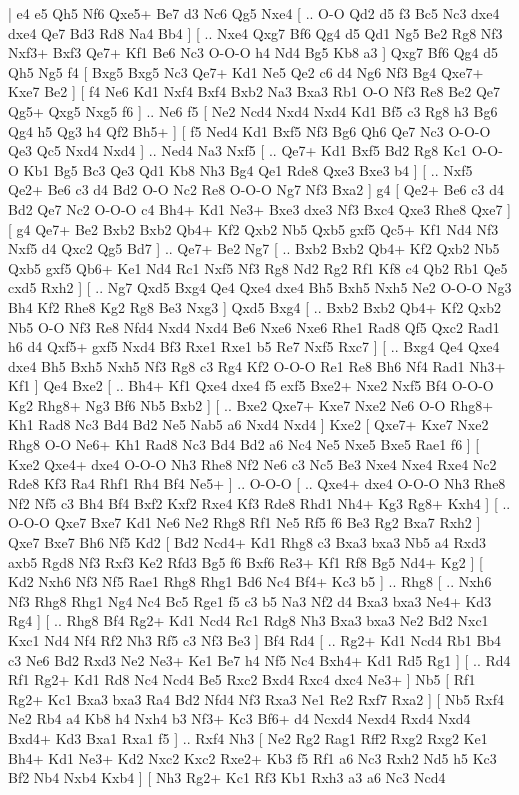 \makegametitle 
|   e4   e5    Qh5   Nf6    Qxe5+   Be7    d3   Nc6    Qg5   Nxe4 [ .. O-O  Qd2 d5  f3 Bc5  Nc3 dxe4  dxe4 Qe7  Bd3 Rd8  Na4 Bb4   ]  [ .. Nxe4  Qxg7 Bf6  Qg4 d5  Qd1 Ng5  Be2 Rg8  Nf3 Nxf3+  Bxf3 Qe7+  Kf1 Be6  Nc3 O-O-O  h4 Nd4  Bg5 Kb8  a3   ]  Qxg7   Bf6    Qg4   d5    Qh5   Ng5    f4 [  Bxg5 Bxg5  Nc3 Qe7+  Kd1 Ne5  Qe2 c6  d4 Ng6  Nf3 Bg4  Qxe7+ Kxe7  Be2   ]  [  f4 Ne6  Kd1 Nxf4  Bxf4 Bxb2  Na3 Bxa3  Rb1 O-O  Nf3 Re8  Be2 Qe7  Qg5+ Qxg5  Nxg5 f6   ] .. Ne6    f5 [  Ne2 Ncd4  Nxd4 Nxd4  Kd1 Bf5  c3 Rg8  h3 Bg6  Qg4 h5  Qg3 h4  Qf2 Bh5+   ]  [  f5 Ned4  Kd1 Bxf5  Nf3 Bg6  Qh6 Qe7  Nc3 O-O-O  Qe3 Qc5  Nxd4 Nxd4   ] .. Ned4    Na3   Nxf5 [ .. Qe7+  Kd1 Bxf5  Bd2 Rg8  Kc1 O-O-O  Kb1 Bg5  Bc3 Qe3  Qd1 Kb8  Nh3 Bg4  Qe1 Rde8  Qxe3 Bxe3  b4   ]  [ .. Nxf5  Qe2+ Be6  c3 d4  Bd2 O-O  Nc2 Re8  O-O-O Ng7  Nf3 Bxa2   ]  g4 [  Qe2+ Be6  c3 d4  Bd2 Qe7  Nc2 O-O-O  c4 Bh4+  Kd1 Ne3+  Bxe3 dxe3  Nf3 Bxc4  Qxe3 Rhe8  Qxe7   ]  [  g4 Qe7+  Be2 Bxb2  Bxb2 Qb4+  Kf2 Qxb2  Nb5 Qxb5  gxf5 Qc5+  Kf1 Nd4  Nf3 Nxf5  d4 Qxc2  Qg5 Bd7   ] .. Qe7+    Be2   Ng7 [ .. Bxb2  Bxb2 Qb4+  Kf2 Qxb2  Nb5 Qxb5  gxf5 Qb6+  Ke1 Nd4  Rc1 Nxf5  Nf3 Rg8  Nd2 Rg2  Rf1 Kf8  c4 Qb2  Rb1 Qe5  cxd5 Rxh2   ]  [ .. Ng7  Qxd5 Bxg4  Qe4 Qxe4  dxe4 Bh5  Bxh5 Nxh5  Ne2 O-O-O  Ng3 Bh4  Kf2 Rhe8  Kg2 Rg8  Be3 Nxg3   ]  Qxd5   Bxg4 [ .. Bxb2  Bxb2 Qb4+  Kf2 Qxb2  Nb5 O-O  Nf3 Re8  Nfd4 Nxd4  Nxd4 Be6  Nxe6 Nxe6  Rhe1 Rad8  Qf5 Qxc2  Rad1 h6  d4 Qxf5+  gxf5 Nxd4  Bf3 Rxe1  Rxe1 b5  Re7 Nxf5  Rxc7   ]  [ .. Bxg4  Qe4 Qxe4  dxe4 Bh5  Bxh5 Nxh5  Nf3 Rg8  c3 Rg4  Kf2 O-O-O  Re1 Re8  Bh6 Nf4  Rad1 Nh3+  Kf1   ]  Qe4   Bxe2 [ .. Bh4+  Kf1 Qxe4  dxe4 f5  exf5 Bxe2+  Nxe2 Nxf5  Bf4 O-O-O  Kg2 Rhg8+  Ng3 Bf6  Nb5 Bxb2   ]  [ .. Bxe2  Qxe7+ Kxe7  Nxe2 Ne6  O-O Rhg8+  Kh1 Rad8  Nc3 Bd4  Bd2 Ne5  Nab5 a6  Nxd4 Nxd4   ]  Kxe2 [  Qxe7+ Kxe7  Nxe2 Rhg8  O-O Ne6+  Kh1 Rad8  Nc3 Bd4  Bd2 a6  Nc4 Ne5  Nxe5 Bxe5  Rae1 f6   ]  [  Kxe2 Qxe4+  dxe4 O-O-O  Nh3 Rhe8  Nf2 Ne6  c3 Nc5  Be3 Nxe4  Nxe4 Rxe4  Nc2 Rde8  Kf3 Ra4  Rhf1 Rh4  Bf4 Ne5+   ] .. O-O-O [ .. Qxe4+  dxe4 O-O-O  Nh3 Rhe8  Nf2 Nf5  c3 Bh4  Bf4 Bxf2  Kxf2 Rxe4  Kf3 Rde8  Rhd1 Nh4+  Kg3 Rg8+  Kxh4   ]  [ .. O-O-O  Qxe7 Bxe7  Kd1 Ne6  Ne2 Rhg8  Rf1 Ne5  Rf5 f6  Be3 Rg2  Bxa7 Rxh2   ]  Qxe7   Bxe7    Bh6   Nf5    Kd2 [  Bd2 Ncd4+  Kd1 Rhg8  c3 Bxa3  bxa3 Nb5  a4 Rxd3  axb5 Rgd8  Nf3 Rxf3  Ke2 Rfd3  Bg5 f6  Bxf6 Re3+  Kf1 Rf8  Bg5 Nd4+  Kg2   ]  [  Kd2 Nxh6  Nf3 Nf5  Rae1 Rhg8  Rhg1 Bd6  Nc4 Bf4+  Kc3 b5   ] .. Rhg8 [ .. Nxh6  Nf3 Rhg8  Rhg1 Ng4  Nc4 Bc5  Rge1 f5  c3 b5  Na3 Nf2  d4 Bxa3  bxa3 Ne4+  Kd3 Rg4   ]  [ .. Rhg8  Bf4 Rg2+  Kd1 Ncd4  Rc1 Rdg8  Nh3 Bxa3  bxa3 Ne2  Bd2 Nxc1  Kxc1 Nd4  Nf4 Rf2  Nh3 Rf5  c3 Nf3  Be3   ]  Bf4   Rd4 [ .. Rg2+  Kd1 Ncd4  Rb1 Bb4  c3 Ne6  Bd2 Rxd3  Ne2 Ne3+  Ke1 Be7  h4 Nf5  Nc4 Bxh4+  Kd1 Rd5  Rg1   ]  [ .. Rd4  Rf1 Rg2+  Kd1 Rd8  Nc4 Ncd4  Be5 Rxc2  Bxd4 Rxc4  dxc4 Ne3+   ]  Nb5 [  Rf1 Rg2+  Kc1 Bxa3  bxa3 Ra4  Bd2 Nfd4  Nf3 Rxa3  Ne1 Re2  Rxf7 Rxa2   ]  [  Nb5 Rxf4  Ne2 Rb4  a4 Kb8  h4 Nxh4  b3 Nf3+  Kc3 Bf6+  d4 Ncxd4  Nexd4 Rxd4  Nxd4 Bxd4+  Kd3 Bxa1  Rxa1 f5   ] .. Rxf4    Nh3 [  Ne2 Rg2  Rag1 Rff2  Rxg2 Rxg2  Ke1 Bh4+  Kd1 Ne3+  Kd2 Nxc2  Kxc2 Rxe2+  Kb3 f5  Rf1 a6  Nc3 Rxh2  Nd5 h5  Kc3 Bf2  Nb4 Nxb4  Kxb4   ]  [  Nh3 Rg2+  Kc1 Rf3  Kb1 Rxh3  a3 a6  Nc3 Ncd4  